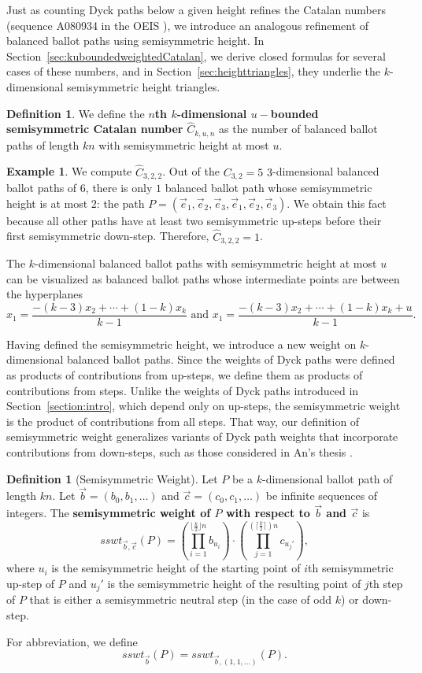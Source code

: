 \documentclass[11pt]{article}
\theoremstyle{remark}
\theoremstyle{definition}
\newtheorem{definition}[theorem]{Definition}
\newtheorem{example}[theorem]{Example}
\begin{document}
Just as counting Dyck paths below a given height refines the Catalan numbers (sequence A080934 in the OEIS \cite{oeis}), we introduce an analogous refinement of balanced ballot paths using semisymmetric height. In Section~\ref{sec:kuboundedweightedCatalan}, we derive closed formulas for several cases of these numbers, and in Section~\ref{sec:heighttriangles}, they underlie the $k$-dimensional semisymmetric height triangles.
\begin{definition}
\label{def:bounded-and-height}
We define the \textbf{$n$th $k$-dimensional $u-$bounded semisymmetric Catalan number} $\widehat{C}_{k,u,n}$ as the number of balanced ballot paths of length $kn$ with semisymmetric height at most $u$.
\end{definition}
\begin{example}
We compute $\widehat{C}_{3, 2, 2}$. Out of the $C_{3 , 2}=5$ $3$-dimensional balanced ballot paths of $6$, there is only $1$ balanced ballot path whose semisymmetric height is at most $2$: the path $P = (\vec{e}_1, \vec{e}_2, \vec{e}_3, \vec{e}_1, \vec{e}_2, \vec{e}_3)$. We obtain this fact because all other paths have at least two semisymmetric up-steps before their first semisymmetric down-step. Therefore, $\widehat{C}_{3, 2, 2}=1$.
\end{example}

The $k$-dimensional balanced ballot paths with semisymmetric height at most $u$ can be visualized as balanced ballot paths whose intermediate points are between the hyperplanes $$ x_1 = \frac{-(k-3)x_2 + \cdots + (1-k)x_k}{k-1} \mbox{ and } x_1 = \frac{-(k-3)x_2 + \cdots + (1-k)x_k + u}{k-1}. $$

Having defined the semisymmetric height, we introduce a new weight on $k$-dimensional balanced ballot paths. Since the weights of Dyck paths were defined as products of contributions from up-steps, we define them as products of contributions from steps. Unlike the weights of Dyck paths introduced in Section~\ref{section:intro}, which depend only on up-steps, the semisymmetric weight is the product of contributions from all steps. That way, our definition of semisymmetric weight generalizes variants of Dyck path weights that incorporate contributions from down-steps, such as those considered in An's thesis \cite{ansthesis}.

\begin{definition}[Semisymmetric Weight]
\label{defn:ssweight}  Let $P$ be a $k$-dimensional ballot path of length $kn$. Let $\vec{b} = (b_0, b_1, \dots)$ and $ \vec{c}=(c_0, c_1, \dots)$ be infinite sequences of integers. The \textbf{semisymmetric weight of $P$ with respect to $\vec{b}$ and $\vec{c}$} is $$sswt_{\vec{b}, \vec{c}}(P)= \left(\prod_{i=1}^{\lfloor \frac{k}{2} \rfloor n}b_{u_i}\right) \cdot \left(\prod_{j=1}^{(\lceil \frac{k}{2} \rceil) n}c_{u_{j}'}\right),$$ where $u_i$ is the semisymmetric height of the starting point of $i$th semisymmetric up-step of $P$ and $u_{j}'$ is the semisymmetric height of the resulting point of $j$th step of $P$ that is either a semisymmetric neutral step (in the case of odd $k$) or down-step.

For abbreviation, we define $$sswt_{\vec{b}}(P) = sswt_{\vec{b}, (1, 1, \dots)}(P).$$
\end{definition}
\end{document}

